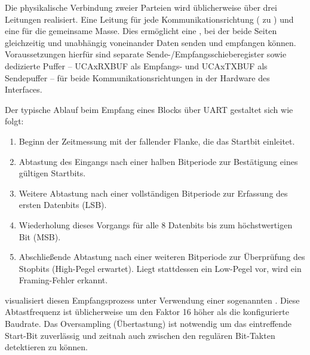 Die physikalische Verbindung zweier Parteien wird \"ublicherweise \"uber drei Leitungen realisiert. Eine Leitung f\"ur jede Kommunikationsrichtung ( zu ) und eine f\"ur die gemeinsame Masse. Dies erm\"oglicht eine , bei der beide Seiten gleichzeitig und unabh\"angig voneinander Daten senden und empfangen k\"onnen. Voraussetzungen hierf\"ur sind separate Sende-/Empfangsschieberegister sowie dedizierte Puffer -- UCAxRXBUF als Empfangs- und UCAxTXBUF als Sendepuffer -- f\"ur beide Kommunikationsrichtungen in der Hardware des Interfaces. 

\newpage
Der typische Ablauf beim Empfang eines Blocks \"uber UART gestaltet sich wie folgt:

\begin{enumerate}
	\item Beginn der Zeitmessung mit der fallender Flanke, die das Startbit einleitet.
	\item Abtastung des Eingangs nach einer halben Bitperiode zur Best\"atigung eines g\"ultigen Startbits.
	\item Weitere Abtastung nach einer vollst\"andigen Bitperiode zur Erfassung des ersten Datenbits (LSB).
	\item Wiederholung dieses Vorgangs f\"ur alle 8 Datenbits bis zum h\"ochstwertigen Bit (MSB).
	\item Abschlie{\ss}ende Abtastung nach einer weiteren Bitperiode zur \"Uberpr\"ufung des Stopbits (High-Pegel erwartet). Liegt stattdessen ein Low-Pegel vor, wird ein Framing-Fehler erkannt.
\end{enumerate}

 visualisiert diesen Empfangsprozess unter Verwendung einer sogenannten . Diese Abtastfrequenz ist \"ublicherweise um den Faktor 16 h\"oher als die konfigurierte Baudrate. Das Oversampling (\"Ubertastung) ist notwendig um das eintreffende Start-Bit zuverl\"assig und zeitnah auch zwischen den regul\"aren Bit-Takten detektieren zu k\"onnen.

